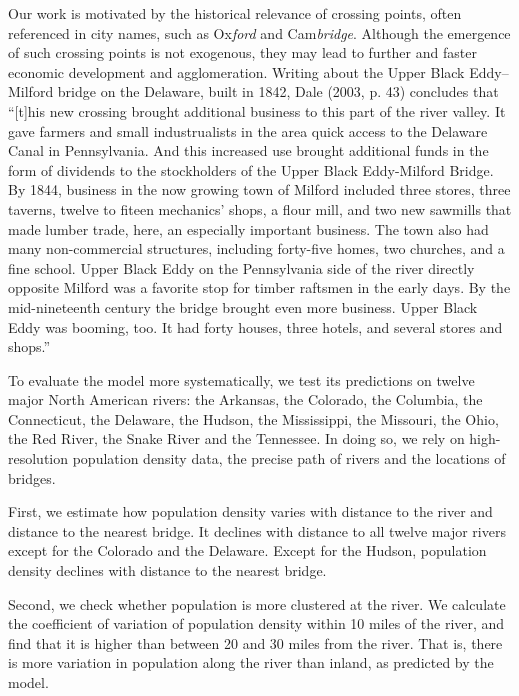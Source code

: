\documentclass[12pt]{article}
\begin{document}
Our work is motivated by the historical relevance of crossing points, often
referenced in city names, such as Ox\emph{ford} and Cam\emph{bridge}.
Although the emergence of such crossing points is not exogenous, they may
lead to further and faster economic development and agglomeration. Writing
about the Upper Black Eddy--Milford bridge on the Delaware, built in 1842,
Dale (2003, p. 43) concludes that ``[t]his new crossing brought additional
business to this part of the river valley. It gave farmers and small
industrualists in the area quick access to the Delaware Canal in
Pennsylvania. And this increased use brought additional funds in the form of
dividends to the stockholders of the Upper Black Eddy-Milford Bridge. By
1844, business in the now growing town of Milford included three stores,
three taverns, twelve to fiteen mechanics' shops, a flour mill, and two new
sawmills that made lumber trade, here, an especially important business. The
town also had many non-commercial structures, including forty-five homes,
two churches, and a fine school. Upper Black Eddy on the Pennsylvania side
of the river directly opposite Milford was a favorite stop for timber
raftsmen in the early days. By the mid-nineteenth century the bridge brought
even more business. Upper Black Eddy was booming, too. It had forty houses,
three hotels, and several stores and shops.''

To evaluate the model more systematically, we test its predictions on twelve
major North American rivers: the Arkansas, the Colorado, the Columbia, the Connecticut, the Delaware, the Hudson, the Mississippi, the Missouri, the Ohio, the Red River, the Snake River and the Tennessee. In doing so, we rely on
high-resolution population density data, the precise path of rivers and the
locations of bridges.

First, we estimate how population density varies with distance to the river
and distance to the nearest bridge. It declines with distance to all twelve 
major rivers except for the Colorado and the Delaware. Except for the 
Hudson, population density declines with distance to the nearest bridge.

Second, we check whether population is more clustered at the river. We
calculate the coefficient of variation of population density within 10 miles
of the river, and find that it is higher than between 20 and 30 miles from
the river. That is, there is more variation in population along the river
than inland, as predicted by the model.

\end{document}
